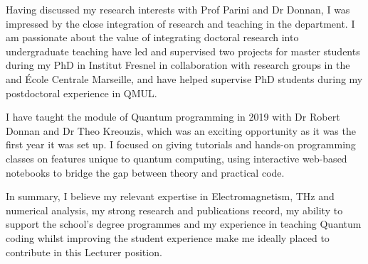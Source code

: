 \documentclass{academia}
\begin{document}
Having discussed my research interests with Prof Parini and Dr Donnan,
I was impressed by the close integration of research and teaching in
the department. I am passionate about the value of integrating doctoral
research into undergraduate teaching have led and supervised two projects for
master students during my PhD in Institut Fresnel in collaboration
with research groups in the and \'Ecole Centrale Marseille, and have helped supervise 
PhD students during my postdoctoral experience in QMUL.

I have taught the module of Quantum programming in 2019 with Dr Robert Donnan and 
Dr Theo Kreouzis, which was an exciting opportunity as it was the first year it 
was set up. I focused on giving tutorials and hands-on programming 
classes on features unique to quantum computing, using interactive web-based notebooks 
to bridge the gap between theory and practical code.

%
%
%
%

In summary, I believe my relevant expertise in Electromagnetism,
THz and numerical analysis, my strong research and publications record, my
ability to support the school’s degree programmes and my
experience in teaching Quantum coding whilst improving the
student experience make me ideally placed to contribute in this 
Lecturer position.
\end{document}
